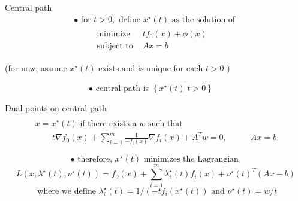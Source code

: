 \documentclass{beamer}
\begin{document}
\begin{frame}[noframenumbering]{Central path}
\begin{equation*}
\begin{aligned} \bullet \text { for } t>0, \text { define } x^{\star}(t) \text { as the solution of } \\ \qquad \begin{array}{ll}{\text { minimize }} & {t f_{0}(x)+\phi(x)} \\ {\text { subject to }} & {A x=b}\end{array} \end{aligned}
\end{equation*}

 (for now, assume $ x^{\star}(t) \text { exists and is unique for each } t>0 \text { ) }
$
 
~~~~~~~~~~~~~~~~~~~~$\bullet$  central path is $\left\{x^{\star}(t) | t>0\right\}
$
\end{frame}
\begin{frame}[noframenumbering]{Dual points on central path}
\begin{equation*}
\begin{aligned} \\ x=x^{\star}(t) \text { if there exists a } w \text { such that } \\ \qquad t \nabla f_{0}(x)+\sum_{i=1}^{m} \frac{1}{-f_{i}(x)} \nabla f_{i}(x)+A^{T} w=0, & \qquad A x=b \end{aligned}
\end{equation*}

\begin{equation*}
\bullet \text { therefore, } x^{\star}(t) \text { minimizes the Lagrangian }
\end{equation*}
\begin{equation}
L\left(x, \lambda^{\star}(t), \nu^{\star}(t)\right)=f_{0}(x)+\sum_{i=1}^{m} \lambda_{i}^{\star}(t) f_{i}(x)+\nu^{\star}(t)^{T}(A x-b)
\end{equation}
\begin{equation*}
\text { where we define } \lambda_{i}^{\star}(t)=1 /\left(-t f_{i}\left(x^{\star}(t)\right) \text { and } \nu^{\star}(t)=w / t\right.
\end{equation*}
\end{frame}
\end{document}
